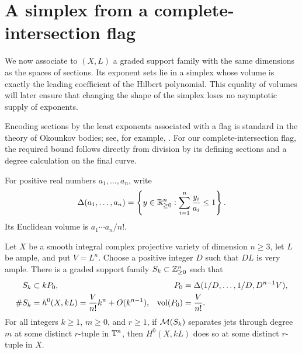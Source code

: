 \section{A simplex from a complete-intersection flag}
\label{sec:flag}

We now associate to $(X,L)$ a graded support family with the same dimensions
as the spaces of sections. Its exponent sets lie in a simplex whose volume
is exactly the leading coefficient of the Hilbert polynomial. This equality
of volumes will later ensure that changing the shape of the simplex loses
no asymptotic supply of exponents.

Encoding sections by the least exponents associated with a flag is standard
in the theory of Okounkov bodies; see, for example,
\citet[Lemma~1.3]{LazarsfeldMustata2009}. For our complete-intersection flag,
the required bound follows directly from division by its defining sections
and a degree calculation on the final curve.

For positive real numbers $a_1,\ldots,a_n$, write
\begin{equation}\label{eq:simplex-definition}
 \Delta(a_1,\ldots,a_n)
 =\left\{y\in\mathbb R_{\geq0}^n:
              \sum_{i=1}^n\frac{y_i}{a_i}\leq1\right\}.
\end{equation}
Its Euclidean volume is $a_1\cdots a_n/n!$.

\begin{proposition}\label{prop:flag-simplex}
Let $X$ be a smooth integral complex projective variety of dimension
$n\geq3$, let $L$ be ample, and put $V=L^n$. Choose a positive integer $D$
such that $DL$ is very ample. There is a graded support family
$S_k\subset\mathbb Z_{\geq0}^n$ such that
\begin{align}
 S_k&\subset kP_0,
 &P_0&=\Delta(1/D,\ldots,1/D,D^{n-1}V),
 \label{eq:flag-simplex}\\
 \#S_k&=h^0(X,kL)
       =\frac{V}{n!}k^n+O(k^{n-1}),
 &\operatorname{vol}(P_0)&=\frac{V}{n!}.
 \label{eq:flag-count}
\end{align}
For all integers $k\geq1$, $m\geq0$, and $r\geq1$, if
$\mathcal M(S_k)$ separates jets through degree $m$ at some distinct $r$-tuple
in $\mathbb T^n$, then $H^0(X,kL)$ does so at some distinct $r$-tuple in $X$.
\end{proposition}

